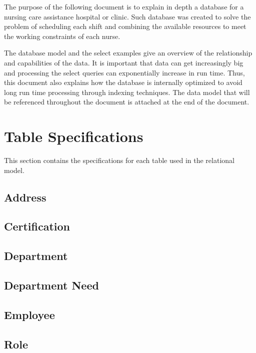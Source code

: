 \documentclass[letter,12pt]{texMemo}
\begin{document}
\maketitle

The purpose of the following document is to explain in depth a database for a nursing care assistance hospital or clinic. Such database was created to solve the problem of scheduling each shift and combining the available resources to meet the working constraints of each nurse.

The database model and the select examples give an overview of the relationship and capabilities of the data. It is important that data can get increasingly big and processing the select queries can exponentially increase in run time. Thus, this document also explains how the database is internally optimized to avoid long run time processing through indexing techniques. The data model that will be referenced throughout the document is attached at the end of the document.
\section*{Table Specifications}
This section contains the specifications for each table used in the relational model.
	\subsection*{Address}
		
	\subsection*{Certification}
		
	\newpage
	\subsection*{Department}
		
	\subsection*{Department Need}
		
	\subsection*{Employee}
		
	\subsection*{Role}
		
	\newpage
\end{document}
